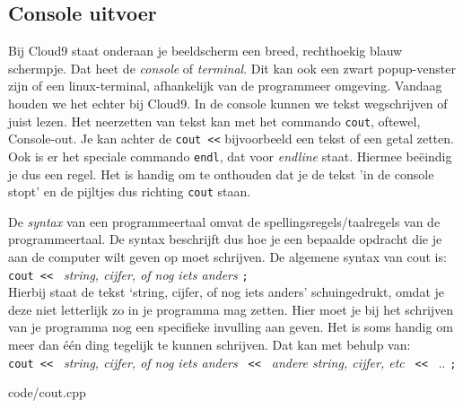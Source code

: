 \documentclass[12pt,a4paper]{article}
\newcommand{\code}{}
\newcommand{\icode}{\lstinline}
\begin{document}
\subsection{Console uitvoer}
Bij Cloud9 staat onderaan je beeldscherm een breed, rechthoekig blauw schermpje. Dat heet de \emph{console} of \emph{terminal}. Dit kan ook een zwart popup-venster zijn of een linux-terminal, afhankelijk van de programmeer omgeving. Vandaag houden we het echter bij Cloud9. In de console kunnen we tekst wegschrijven of juist lezen. Het neerzetten van tekst kan met het commando \icode{cout}, oftewel, Console-out. Je kan achter de \icode{cout <<} bijvoorbeeld een tekst of een getal zetten. Ook is er het speciale commando \icode{endl}, dat voor \emph{endline} staat. Hiermee be\"eindig je dus een regel. Het is handig om te onthouden dat je de tekst 'in de console stopt' en de pijltjes dus richting \icode{cout} staan.

De \emph{syntax} van een programmeertaal omvat de spellingsregels/taalregels van de programmeertaal. De syntax beschrijft dus hoe je een bepaalde opdracht die je aan de computer wilt geven op moet schrijven. De algemene syntax van cout is:\\

\icode{cout << } \emph{string, cijfer, of nog iets anders} \icode{;}\\

Hierbij staat de tekst `string, cijfer, of nog iets anders' schuingedrukt, omdat je deze niet letterlijk zo in je programma mag zetten. Hier moet je bij het schrijven van je programma nog een specifieke invulling aan geven. Het is soms handig om meer dan \'e\'en ding tegelijk te kunnen schrijven. Dat kan met behulp van:\\

\icode{cout << } \emph{string, cijfer, of nog iets anders} \icode{ << } \emph{andere string, cijfer, etc} \icode{ << } .. \icode{;}

\code{code/cout.cpp}
\end{document}
